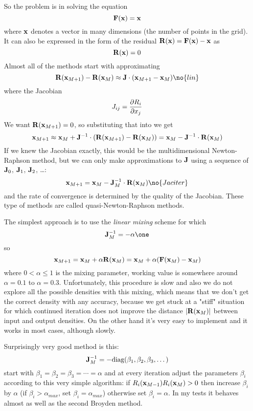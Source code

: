 So the problem is in solving the equation
$${\bf F}({\bf x})={\bf x}$$
where ${\bf x}$ denotes a vector in many dimensions (the number of points in the
grid). It can also be expressed in the
form of the residual ${\bf R}({\bf x})={\bf F}({\bf x})-{\bf x}$ as
$${\bf R}({\bf x})=0$$
Almost all of the methods start with approximating
$$\R(\x_{M+1})-\R(\x_M)\approx\J\cdot(\x_{M+1}-\x_M)\no{lin}$$
where the Jacobian
$$J_{ij}={\partial R_i\over\partial x_j}$$
We want ${\bf R}({\bf x}_{M+1})=0$, so substituting that into  we
get
$${\bf x}_{M+1}\approx{\bf x}_M+{\bf J}^{-1}\cdot({\bf R}({\bf x}_{M+1})-{\bf R}({\bf x}_M))=
{\bf x}_M-{\bf J}^{-1}\cdot{\bf R}({\bf x}_M)$$
If we knew the Jacobian exactly, this would be the multidimensional
Newton-Raphson method, but we can only make approximations to ${\bf J}$ using a
sequence of ${\bf J}_0$, ${\bf J}_1$, ${\bf J}_2$, \dots: 
$$\x_{M+1}=\x_M-\J_M^{-1}\cdot\R(\x_M)\no{Jaciter}$$
and the rate of convergence is determined by the quality of the Jacobian. These type of methods are called quasi-Newton-Raphson methods. 

The simplest approach is to use the {\it linear mixing\/} scheme for which
$$\J_M^{-1}=-\alpha\one$$
so
$${\bf x}_{M+1}={\bf x}_M+\alpha{\bf R}({\bf x}_M)={\bf x}_M+\alpha({\bf F}({\bf x}_M)-{\bf x}_M)$$
where $0<\alpha\le1$ is the mixing parameter, working value is somewhere
around $\alpha=0.1$ to $\alpha=0.3$.
Unfortunately, this procedure is slow and also we do not explore all 
the possible densities with this mixing, which means that we don't
get the correct density with any accuracy, because we get stuck at a "stiff"
situation for which continued iteration does not improve the distance 
$|{\bf R}({\bf x}_M)|$ between input and output densities. On the other hand it's very
easy to implement and it works in most cases, although slowly.

Surprisingly very good method is this:
$${\bf J}_M^{-1}=-{\rm diag}(\beta_1,\beta_2,\beta_3,\dots)$$
start with $\beta_1=\beta_2=\beta_3=\cdots=\alpha$ and
at every iteration adjust the parameters $\beta_i$ according to this very
simple algorithm: if $R_i({\bf x}_{M-1})R_i({\bf x}_M)>0$ then increase $\beta_i$ by
$\alpha$ (if $\beta_i>\alpha_{max}$, set $\beta_i=\alpha_{max}$) otherwise set
$\beta_i=\alpha$. In my tests it behaves almost as well as the second Broyden
method.

